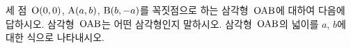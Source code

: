 세 점~$\mathrm{O}(0{,}\mkern3mu\mathopen{}0)$, $\mathrm{A}(a{,}\mkern3mu\mathopen{}b)$, $\mathrm{B}(b{,}\mkern3mu\mathopen{}-a)$를 꼭짓점으로 하는 삼각형~$\mathrm{OAB}$에 대하여 다음에 답하시오.
 삼각형~$\mathrm{OAB}$는 어떤 삼각형인지 말하시오.
 삼각형~$\mathrm{OAB}$의 넓이를 $a$, $b$에 대한 식으로 나타내시오.
